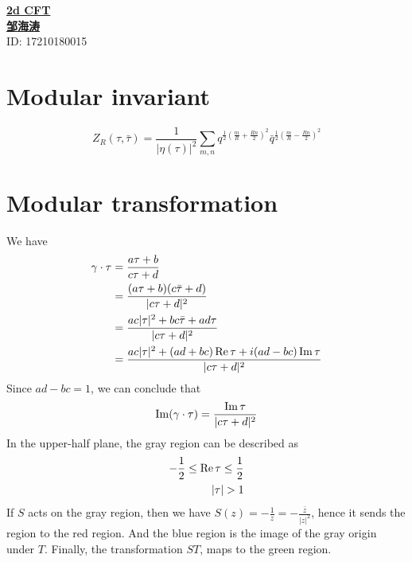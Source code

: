 \newpage
\noindent
{\LARGE\underline{\textbf{2d CFT}}}\\
{\hfill\large  \underline{\textbf{邹海涛}} \\
	\hfill ID: 17210180015}\\
\section{Modular invariant}
\[
Z_R(\tau, \bar{\tau}) = \frac{1}{\lvert \eta (\tau) \rvert ^2} \sum_{m,n} q^{\frac{1}{2}(\frac{m}{R}+ \frac{Rn}{2})^2} \bar{q}^{\frac{1}{2} (\frac{m}{R} - \frac{Rn}{2})^2}
\]
\section{Modular transformation}
We have 
\[
\begin{aligned}
\gamma \cdot \tau &= \frac{a\tau + b}{c\tau + d}\\
& = \frac{(a\tau +b)(c \bar{\tau} +d)}{\lvert c \tau +d \rvert^2}\\
& = \frac{ac \lvert \tau \rvert^2 + bc \bar{\tau} + ad \tau}{\lvert c\tau + d\rvert ^2}\\
& = \frac{ac \lvert \tau \rvert ^2 + (ad+ bc)\operatorname{Re} \tau+ i(ad-bc) \operatorname{Im} \tau}{\lvert c\tau +d \rvert ^2}\\
\end{aligned}
\]
Since $ad-bc=1$, we can conclude that \[\operatorname{Im}(\gamma \cdot \tau) = \frac{\operatorname{Im} \tau}{\lvert c\tau +d\rvert^2}\]
In the upper-half plane, the gray region can be described as
\[
\begin{aligned}
-\frac{1}{2} \leq \operatorname{Re} \tau \leq \frac{1}{2}\\
\lvert \tau \rvert > 1
\end{aligned}
\]
If $S$ acts on the gray region, then we have $S(z) = -\frac{1}{z} = - \frac{\bar{z}}{\lvert z \rvert ^2}$, hence it sends the region to the red region. And the blue region is the image of the gray origin under $T$. Finally, the transformation $ST$, maps to the green region.